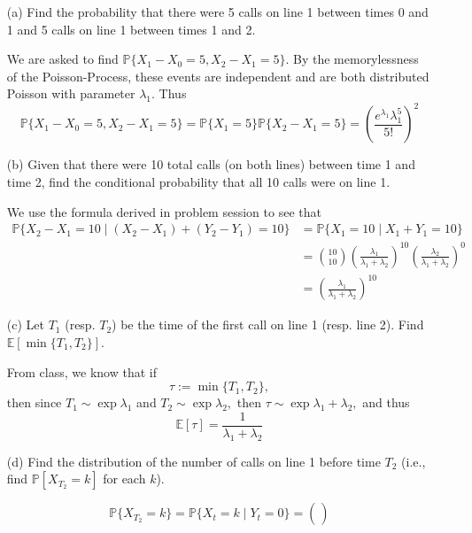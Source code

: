 \documentclass[11pt]{article}
\newcommand{\bbE}{\mathbb{E}}
\newcommand{\bbP}{\mathbb{P}}
\begin{document}
\begin{enumerate}
    \item[(a)] Find the probability that there were 5 calls on line 1 between times 0 and 1 and 5 calls on line 1 between times 1 and 2.
    \begin{solution}
    We are asked to find $\bbP\{X_1 - X_0 = 5, X_2 - X_1 = 5\}.$ By the memorylessness of the Poisson-Process, these events are independent and are both distributed Poisson with parameter $\lambda_1.$ Thus
    \[\bbP\{X_1 - X_0 = 5, X_2 - X_1 = 5\}= \bbP\{X_1 = 5\}\bbP\{X_2 - X_1 = 5\} = (\frac{e^{\lambda_1}\lambda_1^5}{5!})^2\]
    \end{solution}
    \item[(b)] Given that there were 10 total calls (on both lines) between time 1 and time 2, find the conditional probability that all 10 calls were on line 1.
    \begin{solution}
        We use the formula derived in problem session to see that 
        \begin{align*}
        \bbP\{X_2 - X_1 = 10 \mid (X_2 - X_1) + (Y_2 - Y_1) = 10\}& = \bbP\{X_1 = 10 \mid X_1 + Y_1 = 10\}\\ &= \binom{10}{10}(\frac{\lambda_1}{\lambda_1 + \lambda_2})^{10}(\frac{\lambda_2}{\lambda_1 + \lambda_2})^{0}\\ &= (\frac{\lambda_1}{\lambda_1 + \lambda_2})^{10}    
        \end{align*}
        
    \end{solution}
    \item[(c)] Let \(T_1\) (resp. \(T_2\)) be the time of the first call on line 1 (resp. line 2). Find \(\mathbb{E}[\min\{T_1, T_2\}]\).
    \begin{solution}
        From class, we know that if 
        \[\tau := \min\{T_1, T_2\},\] then since $T_1 \sim \exp{\lambda_1}$ and $T_2 \sim \exp{\lambda_2},$ then $\tau \sim \exp{\lambda_1 + \lambda_2},$ and thus 
        \[\bbE[\tau] = \frac{1}{\lambda_1 + \lambda_2}\]
    \end{solution}
    \item[(d)] Find the distribution of the number of calls on line 1 before time \(T_2\) (i.e., find \(\mathbb{P}[X_{T_2} = k]\) for each \(k\)).
    \begin{solution}
\[\bbP\{X_{T_2} = k\} = \bbP\{X_t = k \mid Y_t = 0\} = \binom{}{}\]
    \end{solution}
\end{enumerate}
\end{document}
